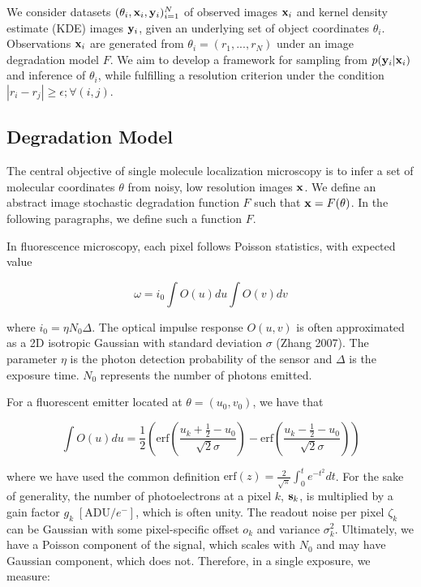\documentclass{article}
\begin{document}
We consider datasets $(\theta_{i}, \bold{x}_i,\bold{y}_i)_{i=1}^{N}$ of observed images $\bold{x}_i$ and kernel density estimate (KDE) images $\bold{y}_{i}$, given an underlying set of object coordinates $\theta_{i}$. Observations $\bold{x}_i$ are generated from $\theta_{i}=(r_{1},...,r_{N})$ under an image degradation model $F$. We aim to develop a framework for sampling from $p(\bold{y}_{i}|\bold{x}_{i})$ and inference of $\theta_{i}$, while fulfilling a resolution criterion under the condition $|r_{i}-r_{j}| \geq \epsilon ; \forall (i,j)$. 

\subsection{Degradation Model}

The central objective of single molecule localization microscopy is to infer a set of molecular coordinates $\theta$ from noisy, low resolution images $\bold{x}$. We define an abstract image stochastic degradation function $F$ such that $\bold{x} = F(\theta)$. In the following paragraphs, we define such a function $F$. 

In fluorescence microscopy, each pixel follows Poisson statistics, with expected value

\begin{equation}
\omega = i_{0}\int O(u)du\int O(v)dv
\end{equation}

where $i_{0} = \eta N_{0}\Delta$. The optical impulse response $O(u,v)$ is often approximated as a 2D isotropic Gaussian with standard deviation $\sigma$ (Zhang 2007). The parameter $\eta$ is the photon detection probability of the sensor and $\Delta$ is the exposure time. $N_{0}$ represents the number of photons emitted.

For a fluorescent emitter located at $\theta = (u_{0},v_{0})$, we have that

\begin{equation}
\int O(u)du = \frac{1}{2}\left(\mathrm{erf}\left(\frac{u_{k}+\frac{1}{2}-u_{0}}{\sqrt{2}\sigma}\right) -\mathrm{erf}\left(\frac{u_{k}-\frac{1}{2}-u_{0}}{\sqrt{2}\sigma}\right)\right)
\end{equation}

where we have used the common definition $\mathrm{erf}(z) = \frac{2}{\sqrt{\pi}}\int_{0}^{t}e^{-t^{2}}dt$. For the sake of generality, the number of photoelectrons at a pixel $k$, $\bold{s}_k$, is  multiplied by a gain factor $g_k \;[\mathrm{ADU}/e^{-}]$, which is often unity. The readout noise per pixel $\zeta_{k}$ can be Gaussian with some pixel-specific offset $o_{k}$ and variance $\sigma_{k}^{2}$. Ultimately, we have a Poisson component of the signal, which scales with $N_{0}$ and may have Gaussian component, which does not. Therefore, in a single exposure, we measure: 
\end{document}
